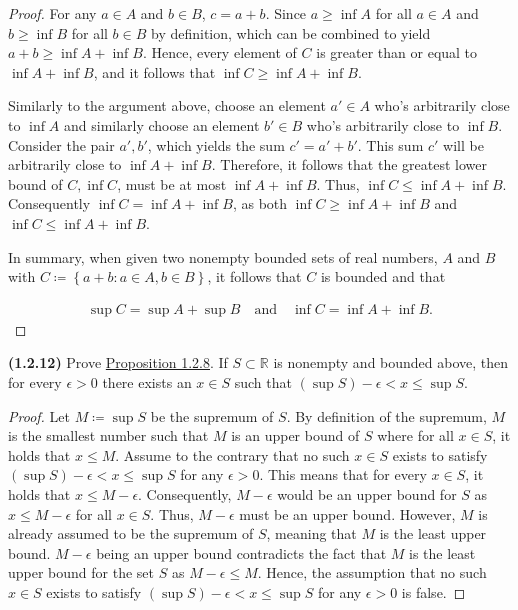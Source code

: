 \documentclass[12pt]{article}
\newcommand{\set}[1]{\left\{ {#1} \right\}}
\newcommand{\bR}{{\mathbb{R}}}
\begin{document}
\begin{proof}
\indent For any $a\in A$ and $b\in B$, $c=a+b$. Since $a\ge \inf A$ for all $a\in A$ and $b\ge\inf B$ for all $b\in B$ by definition, which can be combined to yield $a + b \ge \inf A + \inf B$. Hence, every element of $C$ is greater than or equal to $\inf A + \inf B$, and it follows that $\inf C \ge \inf A + \inf B$.

\indent Similarly to the argument above, choose an element $a'\in A$ who's arbitrarily close to $\inf A$ and similarly choose an element $b'\in B$ who's arbitrarily close to $\inf B$. Consider the pair $a', b'$, which yields the sum $c'=a'+b'$. This sum $c'$ will be arbitrarily close to $\inf A + \inf B$. Therefore, it follows that the greatest lower bound of $C, \inf C$, must be at most $\inf A + \inf B$. Thus, $\inf C \le \inf A + \inf B$. Consequently $\inf C = \inf A + \inf B$, as both $\inf C \ge \inf A + \inf B$ and $\inf C \le \inf A + \inf B$.

\indent In summary, when given two nonempty bounded sets of real numbers, $A$ and $B$ with $C \coloneq \set{a+b : a\in A, b\in B}$, it follows that $C$ is bounded and that

\begin{align*}
	\sup C = \sup A + \sup B \quad \text{and} \quad \inf C = \inf A + \inf B.
\end{align*}

\end{proof}

\newpage

\noindent \textbf{(1.2.12)} Prove \underline{Proposition 1.2.8}. If $S \subset \bR$ is nonempty and bounded above, then for every $\epsilon > 0$ there exists an $x\in S$ such that $(\sup S)-\epsilon < x \le \sup S$.

\begin{proof}
	Let $M\coloneq\sup S$ be the supremum of $S$. By definition of the supremum, $M$ is the smallest number such that $M$ is an upper bound of $S$ where for all $x \in S$, it holds that $x\le M$.
	\indent Assume to the contrary that no such $x\in S$ exists to satisfy $(\sup S)-\epsilon < x \le \sup S$ for any $\epsilon > 0$. This means that for every $x\in S$, it holds that $x\le M -\epsilon$. Consequently, $M-\epsilon$ would be an upper bound for $S$ as $x\le M-\epsilon$ for all $x\in S$. Thus, $M-\epsilon$ must be an upper bound. However, $M$ is already assumed to be the supremum of $S$, meaning that $M$ is the least upper bound. $M-\epsilon$ being an upper bound contradicts the fact that $M$ is the least upper bound for the set $S$ as $M-\epsilon\le M$. Hence, the assumption that no such $x\in S$ exists to satisfy $(\sup S)-\epsilon < x \le \sup S$ for any $\epsilon > 0$ is false.
	
\end{proof}
\end{document}
